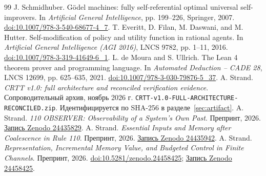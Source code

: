 \begin{thebibliography}{99}
 J. Schmidhuber. G\"odel machines: fully self-referential optimal universal self-improvers. In \emph{Artificial General Intelligence}, pp. 199--226, Springer, 2007. \href{https://doi.org/10.1007/978-3-540-68677-4_7}{doi:10.1007/978-3-540-68677-4\_7}.
 T. Everitt, D. Filan, M. Daswani, and M. Hutter. Self-modification of policy and utility function in rational agents. In \emph{Artificial General Intelligence (AGI 2016)}, LNCS 9782, pp. 1--11, 2016. \href{https://doi.org/10.1007/978-3-319-41649-6_1}{doi:10.1007/978-3-319-41649-6\_1}.
 L. de Moura and S. Ullrich. The Lean 4 theorem prover and programming language. In \emph{Automated Deduction -- CADE 28}, LNCS 12699, pp. 625--635, 2021. \href{https://doi.org/10.1007/978-3-030-79876-5_37}{doi:10.1007/978-3-030-79876-5\_37}.
 A. Strand. \emph{CRTT v1.0: full architecture and reconciled verification evidence}. Сопроводительный архив, ноябрь 2026 г. \texttt{CRTT-v1.0-FULL-ARCHITECTURE-RECONCILED.zip}. Идентифицируется по SHA-256 в разделе~\ref{sec:artifact}.
 A. Strand. \emph{110 OBSERVER: Observability of a System's Own Past}. Препринт, 2026. \href{https://zenodo.org/records/24435829}{Запись Zenodo 24435829}.
 A. Strand. \emph{Essential Inputs and Memory after Coalescence in Rule 110}. Препринт, 2026. \href{https://zenodo.org/records/24435942}{Запись Zenodo 24435942}.
 A. Strand. \emph{Representation, Incremental Memory Value, and Budgeted Control in Finite Channels}. Препринт, 2026. \href{https://doi.org/10.5281/zenodo.24458425}{doi:10.5281/zenodo.24458425}; \href{https://zenodo.org/records/24458425}{Запись Zenodo 24458425}.
\end{thebibliography}
